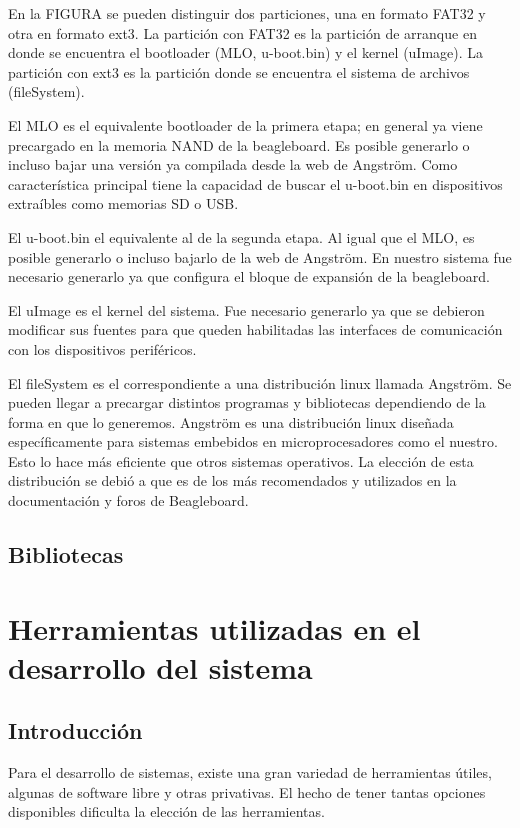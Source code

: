 En la FIGURA se pueden distinguir dos particiones, una en formato FAT32 y otra en formato ext3.
La partición con FAT32 es la partición de arranque en donde se encuentra el bootloader (MLO, u-boot.bin) y el kernel (uImage).
La partición con ext3 es la partición donde se encuentra el sistema de archivos (fileSystem).

El MLO es el equivalente bootloader de la primera etapa; en general ya viene precargado en la memoria NAND de la beagleboard. Es posible generarlo o incluso bajar una versión ya compilada desde la web de Angström. Como característica principal tiene la capacidad de buscar el u-boot.bin en dispositivos extraíbles como memorias SD o USB.

El u-boot.bin el equivalente al de la segunda etapa. Al igual que el MLO, es posible generarlo o incluso bajarlo de la web de Angström. En nuestro sistema fue necesario generarlo ya que configura el bloque de expansión de la beagleboard.

El uImage es el kernel del sistema. Fue necesario generarlo ya que se debieron modificar sus fuentes para que queden habilitadas las interfaces de comunicación con los dispositivos periféricos.

El fileSystem es el correspondiente a una distribución linux llamada Angström. Se pueden llegar a precargar distintos programas y bibliotecas dependiendo de la forma en que lo generemos.
Angström es una distribución linux diseñada específicamente para sistemas embebidos en microprocesadores como el nuestro. Esto lo hace más eficiente que otros sistemas operativos. La elección de esta distribución se debió a que es de los más recomendados y utilizados en la documentación y foros de Beagleboard.


\subsection{Bibliotecas}


\section{Herramientas utilizadas en el desarrollo del sistema}

\subsection{Introducción}
Para el desarrollo de sistemas, existe una gran variedad de herramientas útiles, algunas de software libre y otras privativas. El hecho de tener tantas opciones disponibles dificulta la elección de las herramientas. 

